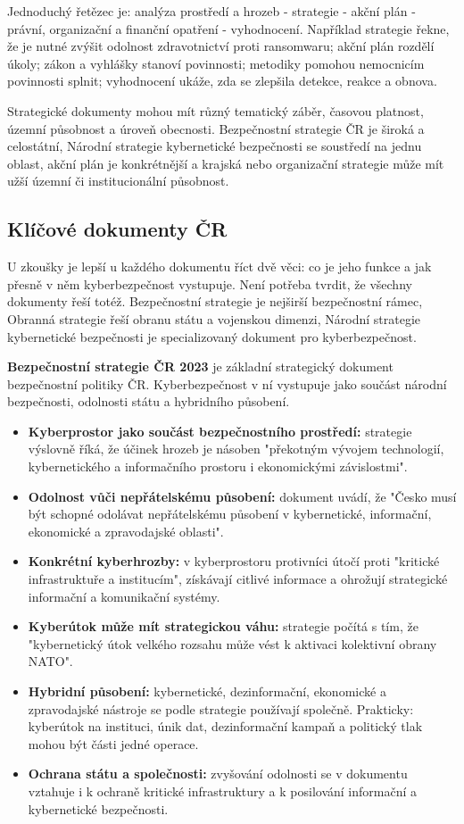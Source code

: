 \documentclass[11pt,a4paper]{article}
\begin{document}
Jednoduchý řetězec je: analýza prostředí a hrozeb - strategie - akční plán - právní, organizační a finanční opatření - vyhodnocení. Například strategie řekne, že je nutné zvýšit odolnost zdravotnictví proti ransomwaru; akční plán rozdělí úkoly; zákon a vyhlášky stanoví povinnosti; metodiky pomohou nemocnicím povinnosti splnit; vyhodnocení ukáže, zda se zlepšila detekce, reakce a obnova.

Strategické dokumenty mohou mít různý tematický záběr, časovou platnost, územní působnost a úroveň obecnosti. Bezpečnostní strategie ČR je široká a celostátní, Národní strategie kybernetické bezpečnosti se soustředí na jednu oblast, akční plán je konkrétnější a krajská nebo organizační strategie může mít užší územní či institucionální působnost.

\subsection*{Klíčové dokumenty ČR}
U zkoušky je lepší u každého dokumentu říct dvě věci: co je jeho funkce a jak přesně v něm kyberbezpečnost vystupuje. Není potřeba tvrdit, že všechny dokumenty řeší totéž. Bezpečnostní strategie je nejširší bezpečnostní rámec, Obranná strategie řeší obranu státu a vojenskou dimenzi, Národní strategie kybernetické bezpečnosti je specializovaný dokument pro kyberbezpečnost.

\textbf{Bezpečnostní strategie ČR 2023} je základní strategický dokument bezpečnostní politiky ČR. Kyberbezpečnost v ní vystupuje jako součást národní bezpečnosti, odolnosti státu a hybridního působení.
\begin{itemize}
  \item \textbf{Kyberprostor jako součást bezpečnostního prostředí:} strategie výslovně říká, že účinek hrozeb je násoben "překotným vývojem technologií, kybernetického a informačního prostoru i ekonomickými závislostmi".
  \item \textbf{Odolnost vůči nepřátelskému působení:} dokument uvádí, že "Česko musí být schopné odolávat nepřátelskému působení v kybernetické, informační, ekonomické a zpravodajské oblasti".
  \item \textbf{Konkrétní kyberhrozby:} v kyberprostoru protivníci útočí proti "kritické infrastruktuře a institucím", získávají citlivé informace a ohrožují strategické informační a komunikační systémy.
  \item \textbf{Kyberútok může mít strategickou váhu:} strategie počítá s tím, že "kybernetický útok velkého rozsahu může vést k aktivaci kolektivní obrany NATO".
  \item \textbf{Hybridní působení:} kybernetické, dezinformační, ekonomické a zpravodajské nástroje se podle strategie používají společně. Prakticky: kyberútok na instituci, únik dat, dezinformační kampaň a politický tlak mohou být části jedné operace.
  \item \textbf{Ochrana státu a společnosti:} zvyšování odolnosti se v dokumentu vztahuje i k ochraně kritické infrastruktury a k posilování informační a kybernetické bezpečnosti.
\end{itemize}
\end{document}

